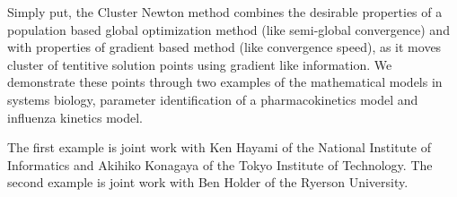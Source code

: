 \documentclass{report}
\begin{document}
Simply put, the Cluster Newton method combines the desirable properties
of a population based global optimization method (like semi-global
convergence) and with properties of gradient based method (like
convergence speed), as it moves cluster of tentitive solution points
using gradient like information.
We demonstrate these points through two examples of the mathematical
models in systems biology, parameter identification of a pharmacokinetics
model and influenza kinetics model.

The first example is joint work with Ken Hayami of the National Institute
of Informatics and Akihiko Konagaya of the Tokyo Institute of Technology.
The second example is joint work with Ben Holder of the Ryerson
University.
\end{document}
